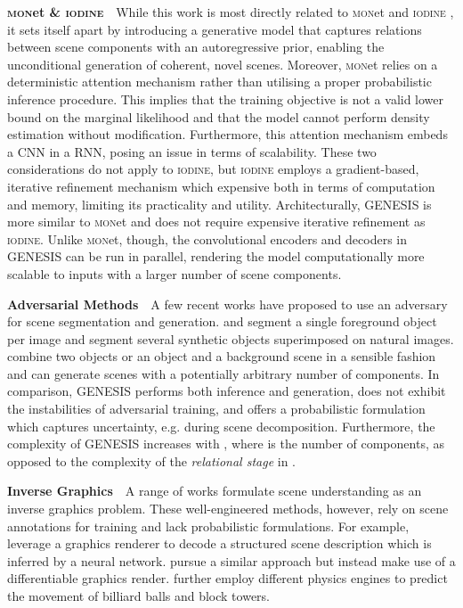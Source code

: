 \documentclass{article}
\begin{document}
\textbf{\textsc{mon}et \& \textsc{iodine}}\ \
While this work is most directly related to \textsc{mon}et \citep{burgess2019monet} and \mbox{\textsc{iodine}} \citep{greff2019multi}, it sets itself apart by introducing a generative model that captures relations between scene components with an autoregressive prior, enabling the unconditional generation of coherent, novel scenes.
Moreover, \textsc{mon}et relies on a deterministic attention mechanism rather than utilising a proper probabilistic inference procedure.
This implies that the training objective is not a valid lower bound on the marginal likelihood and that the model cannot perform density estimation without modification.
Furthermore, this attention mechanism embeds a \gls{CNN} in a \gls{RNN}, posing an issue in terms of scalability.
These two considerations do not apply to \textsc{iodine}, but \textsc{iodine} employs a gradient-based, iterative refinement mechanism which expensive both in terms of computation and memory, limiting its practicality and utility.
Architecturally, \gls{GENESIS} is more similar to \textsc{mon}et and does not require expensive iterative refinement as \textsc{iodine}.
Unlike \textsc{mon}et, though, the convolutional encoders and decoders in \gls{GENESIS} can be run in parallel, rendering the model computationally more scalable to inputs with a larger number of scene components.




\textbf{Adversarial Methods}\ \
A few recent works have proposed to use an adversary for scene segmentation and generation.
\citet{chen2019unsupervised} and \citet{bielski2019emergence} segment a single foreground object per image and \citet{arandjelovic2019object} segment several synthetic objects superimposed on natural images.
\citet{azadicompositional} combine two objects or an object and a background scene in a sensible fashion and \citet{van2018case} can generate scenes with a potentially arbitrary number of components.
In comparison, \gls{GENESIS} performs both inference and generation, does not exhibit the instabilities of adversarial training, and offers a probabilistic formulation which captures uncertainty, e.g. during scene decomposition.
Furthermore, the complexity of \gls{GENESIS} increases with , where  is the number of components, as opposed to the  complexity of the \emph{relational stage} in \citet{van2018case}.

\textbf{Inverse Graphics}\ \ 
A range of works formulate scene understanding as an inverse graphics problem.
These well-engineered methods, however, rely on scene annotations for training and lack probabilistic formulations.
For example, \citet{wu2017neural} leverage a graphics renderer to decode a structured scene description which is inferred by a neural network.
\citet{romaszko2017vision} pursue a similar approach but instead make use of a differentiable graphics render.
\citet{wu2017learning} further employ different physics engines to predict the movement of billiard balls and block towers.
\end{document}
